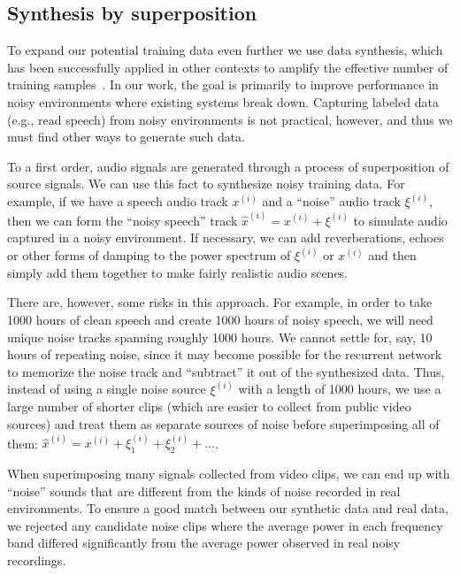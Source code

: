\documentclass{article}
\begin{document}
\subsection{Synthesis by superposition}
\label{section:noisesynth}

To expand our potential training data even further we use data synthesis, which
has been successfully applied in other contexts to amplify the effective number
of training
samples~\cite{sapp2008synth,lecun2004learningmethods,coates2011icdar}. In our
work, the goal is primarily to improve performance in noisy environments where
existing systems break down.  Capturing labeled data (e.g., read speech) from
noisy environments is not practical, however, and thus we must find other ways
to generate such data.

To a first order, audio signals are generated through a process of
superposition of source signals.  We can use this fact to synthesize noisy
training data.  For example, if we have a speech audio track $x^{(i)}$ and a
``noise'' audio track $\xi^{(i)}$, then we can form the ``noisy speech'' track
$\hat{x}^{(i)} = x^{(i)}+\xi^{(i)}$ to simulate audio captured in a noisy
environment.  If necessary, we can add reverberations, echoes or other forms of
damping to the power spectrum of $\xi^{(i)}$ or $x^{(i)}$ and then simply add
them together to make fairly realistic audio scenes.

There are, however, some risks in this approach. For example, in order
to take 1000 hours of clean speech and create 1000 hours of noisy speech,
we will need unique noise tracks spanning roughly 1000 hours.  
We cannot settle for, say, 10 hours of
repeating noise, since it may become possible for the recurrent
network to memorize the noise track and ``subtract'' it out of the
synthesized data.  Thus, instead of using a single noise source
$\xi^{(i)}$ with a length of 1000 hours, we use a large number
of shorter clips (which are easier to collect from public video
sources) and treat them as separate sources of noise before
superimposing all of them: $\hat{x}^{(i)} = x^{(i)} + \xi_1^{(i)}
+\xi_2^{(i)} + \ldots$.

When superimposing many signals collected from video clips, we can end up with
``noise'' sounds that are different from the kinds of noise recorded in real
environments.  To ensure a good match between our synthetic data and real data,
we rejected any candidate noise clips where the average power in each frequency
band differed significantly from the average power observed in real noisy
recordings.
\end{document}
